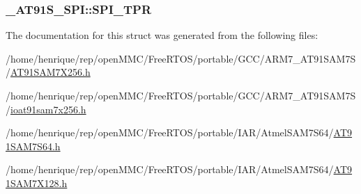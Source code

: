 \hypertarget{struct__AT91S__SPI_a742551597beffa41c6c784fded134ca6}{
\subsubsection[{S\-P\-I\-\_\-\-T\-P\-R}]{ \-\_\-\-A\-T91\-S\-\_\-\-S\-P\-I\-::\-S\-P\-I\-\_\-\-T\-P\-R}}\label{struct__AT91S__SPI_a742551597beffa41c6c784fded134ca6}


The documentation for this struct was generated from the following files\-:\begin{DoxyCompactItemize}
\item 
/home/henrique/rep/open\-M\-M\-C/\-Free\-R\-T\-O\-S/portable/\-G\-C\-C/\-A\-R\-M7\-\_\-\-A\-T91\-S\-A\-M7\-S/\hyperlink{GCC_2ARM7__AT91SAM7S_2AT91SAM7X256_8h}{A\-T91\-S\-A\-M7\-X256.\-h}\item 
/home/henrique/rep/open\-M\-M\-C/\-Free\-R\-T\-O\-S/portable/\-G\-C\-C/\-A\-R\-M7\-\_\-\-A\-T91\-S\-A\-M7\-S/\hyperlink{ioat91sam7x256_8h}{ioat91sam7x256.\-h}\item 
/home/henrique/rep/open\-M\-M\-C/\-Free\-R\-T\-O\-S/portable/\-I\-A\-R/\-Atmel\-S\-A\-M7\-S64/\hyperlink{AT91SAM7S64_8h}{A\-T91\-S\-A\-M7\-S64.\-h}\item 
/home/henrique/rep/open\-M\-M\-C/\-Free\-R\-T\-O\-S/portable/\-I\-A\-R/\-Atmel\-S\-A\-M7\-S64/\hyperlink{AT91SAM7X128_8h}{A\-T91\-S\-A\-M7\-X128.\-h}\end{DoxyCompactItemize}
